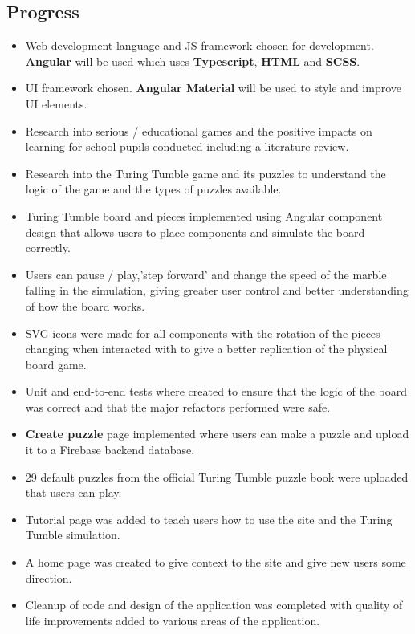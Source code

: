 \documentclass[11pt]{article}
\begin{document}
\subsection{Progress}\label{progress}

\begin{itemize}
    \item Web development language and JS framework chosen for development. \textbf{Angular} will be used which uses \textbf{Typescript}, \textbf{HTML} and \textbf{SCSS}.
    \item UI framework chosen. \textbf{Angular Material} will be used to style and improve UI elements.
    \item Research into serious / educational games and the positive impacts on learning for school pupils conducted including a literature review.
    \item Research into the Turing Tumble game and its puzzles to understand the logic of the game and the types of puzzles available.
    \item Turing Tumble board and pieces implemented using Angular component design that allows users to place components and simulate the board correctly.
    \item Users can pause / play,'step forward' and change the speed of the marble falling in the simulation, giving greater user control and better understanding of how the board works.
    \item SVG icons were made for all components with the rotation of the pieces changing when interacted with to give a better replication of the physical board game.
    \item Unit and end-to-end tests where created to ensure that the logic of the board was correct and that the major refactors performed were safe.
    \item \textbf{Create puzzle} page implemented where users can make a puzzle and upload it to a Firebase backend database.
    \item 29 default puzzles from the official Turing Tumble puzzle book were uploaded that users can play.
    \item Tutorial page was added to teach users how to use the site and the Turing Tumble simulation.
    \item A home page was created to give context to the site and give new users some direction.
    \item Cleanup of code and design of the application was completed with quality of life improvements added to various areas of the application.
\end{itemize}
\end{document}
